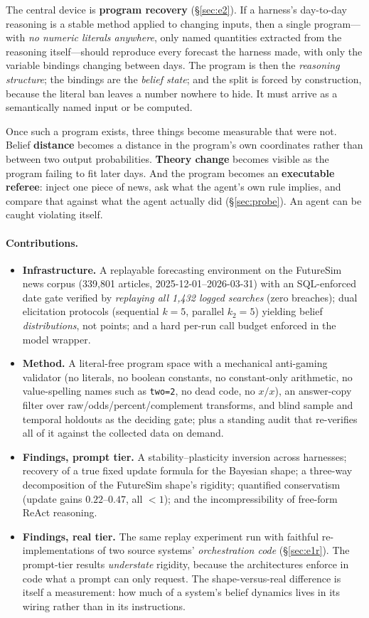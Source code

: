 \documentclass[10pt]{article}
\begin{document}
The central device is \textbf{program recovery} (\S\ref{sec:e2}). If a harness's day-to-day
reasoning is a stable method applied to changing inputs, then a single program---with \emph{no
numeric literals anywhere}, only named quantities extracted from the reasoning itself---should
reproduce every forecast the harness made, with only the variable bindings changing between days.
The program is then the \emph{reasoning structure}; the bindings are the \emph{belief state}; and
the split is forced by construction, because the literal ban leaves a number nowhere to hide. It
must arrive as a semantically named input or be computed.

Once such a program exists, three things become measurable that were not. Belief \textbf{distance}
becomes a distance in the program's own coordinates rather than between two output probabilities.
\textbf{Theory change} becomes visible as the program failing to fit later days. And the program
becomes an \textbf{executable referee}: inject one piece of news, ask what the agent's own rule
implies, and compare that against what the agent actually did (\S\ref{sec:probe}). An agent can
be caught violating itself.

\paragraph{Contributions.}
\begin{itemize}
\item \textbf{Infrastructure.} A replayable forecasting environment on the FutureSim news corpus
(339{,}801 articles, 2025-12-01--2026-03-31) with an SQL-enforced date gate verified by
\emph{replaying all 1{,}432 logged searches} (zero breaches); dual elicitation protocols
(sequential $k{=}5$, parallel $k_2{=}5$) yielding belief \emph{distributions}, not points; and a
hard per-run call budget enforced in the model wrapper.
\item \textbf{Method.} A literal-free program space with a mechanical anti-gaming validator (no
literals, no boolean constants, no constant-only arithmetic, no value-spelling names such as
\texttt{two=2}, no dead code, no $x/x$), an answer-copy filter over raw/odds/percent/complement
transforms, and blind sample and temporal holdouts as the deciding gate; plus a standing audit
that re-verifies all of it against the collected data on demand.
\item \textbf{Findings, prompt tier.} A stability--plasticity inversion across harnesses;
recovery of a true fixed update formula for the Bayesian shape; a three-way decomposition of the
FutureSim shape's rigidity; quantified conservatism (update gains $0.22$--$0.47$, all $<\!1$);
and the incompressibility of free-form ReAct reasoning.
\item \textbf{Findings, real tier.} The same replay experiment run with faithful
re-implementations of two source systems' \emph{orchestration code} (\S\ref{sec:e1r}). The
prompt-tier results \emph{understate} rigidity, because the architectures enforce in code what a
prompt can only request. The shape-versus-real difference is itself a measurement: how much of a
system's belief dynamics lives in its wiring rather than in its instructions.
\end{itemize}
\end{document}
